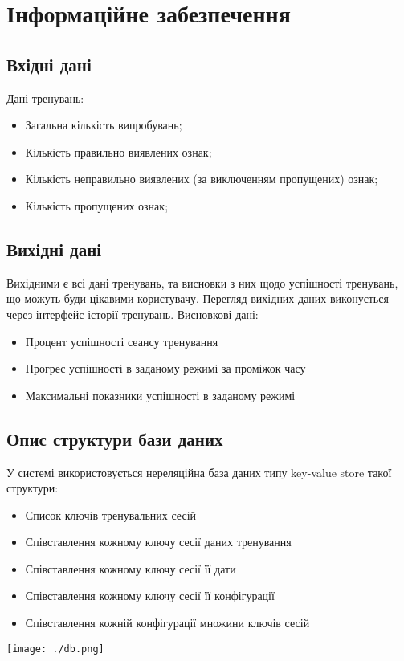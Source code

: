 \section{Інформаційне забезпечення}
\subsection{Вхідні дані}


Дані тренувань:
\begin{itemize}
  \item Загальна кількість випробувань;
  \item Кількість правильно виявлених ознак;
  \item Кількість неправильно виявлених (за виключенням пропущених) ознак;
  \item Кількість пропущених ознак;
\end{itemize}

\subsection{Вихідні дані}

Вихідними є всі дані тренувань, та висновки з них щодо успішності тренувань, що можуть буди цікавими користувачу. Перегляд вихідних даних виконується через інтерфейс історії тренувань.
Висновкові дані:
\begin{itemize}
  \item Процент успішності сеансу тренування
  \item Прогрес успішності в заданому режимі за проміжок часу
  \item Максимальні показники успішності в заданому режимі
\end{itemize}

\subsection{Опис структури бази даних}

У системі використовується нереляційна база даних типу key-value store такої структури:
\begin{itemize}
  \item Список ключів тренувальних сесій
  \item Співставлення кожному ключу сесії даних тренування
  \item Співставлення кожному ключу сесії її дати
  \item Співставлення кожному ключу сесії її конфігурації
  \item Співставлення кожній конфігурації множини ключів сесій
\end{itemize}

\begin{center}
  \texttt{[image: ./db.png]}
\end{center}
